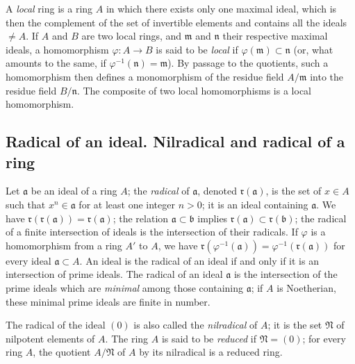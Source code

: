 \begin{env}[1.0.7]
\label{0.1.0.7}
A \emph{local} ring is a ring $A$ in which there exists only one maximal ideal, which is then the complement of the set of invertible elements and contains all the ideals $\neq A$.
If $A$ and $B$ are two local rings, and $\mathfrak{m}$ and $\mathfrak{n}$ their respective maximal ideals, a homomorphism $\varphi:A\to B$ is said to be \emph{local} if $\varphi(\mathfrak{m})\subset\mathfrak{n}$ (or, what amounts to the same, if $\varphi^{-1}(\mathfrak{n})=\mathfrak{m}$).
By passage to the quotients, such a homomorphism then defines a monomorphism of the residue field $A/\mathfrak{m}$ into the residue field $B/\mathfrak{n}$.
The composite of two local homomorphisms is a local homomorphism.
\end{env}

\subsection{Radical of an ideal. Nilradical and radical of a ring}
\label{subsection:0.1.1}

\begin{env}[1.1.1]
\label{0.1.1.1}
Let $\mathfrak{a}$ be an ideal of a ring $A$; the \emph{radical} of $\mathfrak{a}$, denoted $\mathfrak{r}(\mathfrak{a})$, is the set of $x\in A$ such that $x^n\in\mathfrak{a}$ for at least one integer $n>0$; it is an ideal containing $\mathfrak{a}$.
We have $\mathfrak{r}(\mathfrak{r}(\mathfrak{a}))=\mathfrak{r}(\mathfrak{a})$; the relation $\mathfrak{a}\subset\mathfrak{b}$ implies $\mathfrak{r}(\mathfrak{a})\subset\mathfrak{r}(\mathfrak{b})$; the radical of a finite intersection of ideals is the intersection of their radicals.
If $\varphi$ is a homomorphism from a ring $A'$ to $A$, we have $\mathfrak{r}(\varphi^{-1}(\mathfrak{a}))=\varphi^{-1}(\mathfrak{r}(\mathfrak{a}))$ for every ideal $\mathfrak{a}\subset A$.
An ideal is the radical of an ideal if and only if it is an intersection of prime ideals.
The radical of an ideal $\mathfrak{a}$ is the intersection of the prime ideals which are \emph{minimal} among those containing $\mathfrak{a}$; if $A$ is Noetherian, these minimal prime ideals are finite in number.

The radical of the ideal $(0)$ is also called the \emph{nilradical} of $A$; it is the set $\mathfrak{N}$ of nilpotent elements of $A$.
The ring $A$ is said to be \emph{reduced} if $\mathfrak{N}=(0)$; for every ring $A$, the quotient $A/\mathfrak{N}$ of $A$ by its nilradical is a reduced ring.
\end{env}

